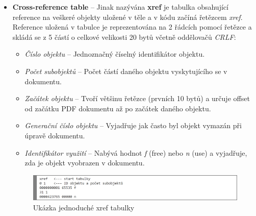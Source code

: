 \begin{itemize}
	\item \textbf{Cross-reference table} -- Jinak nazývána \textbf{xref} je tabulka obsahující reference na veškeré objekty uložené v těle a v kódu začíná řetězcem \textit{xref}. Reference uložená v tabulce je reprezentována na 2 řádcích pomocí řetězce a skládá se z 5 částí o celkové velikosti 20 bytů včetně oddělovačů \textit{CRLF}:
	\begin{itemize}
		\item \textit{Číslo objektu} -- Jednoznačný číselný identifikátor objektu.
		\item \textit{Počet subobjektů} -- Počet částí daného objektu vyskytujícího se v dokumentu.
		\item \textit{Začátek objektu} -- Tvoří většinu řetězce (prvních 10 bytů) a určuje offset od začátku PDF dokumentu až po začátek daného objektu.
		\item \textit{Generační číslo objektu} -- Vyjadřuje jak často byl objekt vymazán při úpravě dokumentu. 
		\item \textit{Identifikátor využití} -- Nabývá hodnot \textit{f} (free) nebo \textit{n} (use) a vyjadřuje, zda je objekt vyobrazen v dokumentu.
	\end{itemize}
	\begin{figure}[h!]
	\centering
	\includegraphics[width=15cm]{img/pdf_xref}
	\caption{Ukázka jednoduché xref tabulky}
	\label{fig:pdf_xref}
	\end{figure}


\end{itemize}
